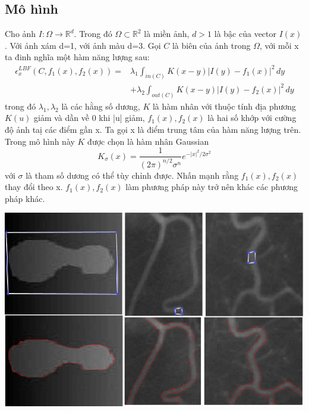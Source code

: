 \documentclass[12pt, oneside, a4]{book}
\begin{document}
\subsection{Mô hình}
\hspace{0.5cm}Cho ảnh $I: \Omega \rightarrow \mathbb{R}^d$. Trong đó $\Omega \subset \mathbb{R}^2$  là miền ảnh, $d>1$ là bậc của vector $I(x)$. Với ảnh xám d=1, với ảnh màu d=3. Gọi $C$ là biên của ảnh trong $\Omega$, với mỗi x ta đinh nghĩa một hàm năng lượng sau:
\begin{equation}
\begin{split}
\epsilon_x^{LBF}(C, f_1(x), f_2(x))=&\lambda_1 \int_{in(C)} K(x-y)|I(y)-f_1(x)|^2\,dy\\
									&+ \lambda_2 \int_{out(C)} K(x-y)|I(y)-f_2(x)|^2\,dy 
\end{split}
\end{equation}
trong đó $\lambda_1, \lambda_2$ là các hằng số dương, $K$ là hàm nhân với thuộc tính địa phương $K(u)$ giảm và dần về 0 khi |u| giảm, $f_1(x), f_2(x)$ là hai số khớp với cường độ ảnh taị các điểm gần x. Ta gọi x là điểm trung tâm của hàm năng lượng trên. Trong mô hình này $K$ được chọn là hàm nhân Gaussian
\begin{equation*}
K_{\sigma}(x)=\dfrac{1}{(2\pi)^{n/2}\sigma^n}e^{-|x|^2/2\sigma^2}
\end{equation*}
với $\sigma$ là tham số dương có thể tùy chỉnh được. Nhấn mạnh rằng $f_1(x), f_2(x)$ thay đổi theo x. $f_1(x), f_2(x)$ làm phương pháp này trở nên khác các phương pháp khác.
\begin{center}
\includegraphics[scale=0.7]{figure/LBFresult.png}
\end{center}
\end{document}
